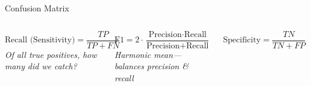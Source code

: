 \documentclass[aspectratio=169,11pt]{beamer}
\begin{document}
\begin{frame}{Confusion Matrix}
\begin{columns}[T]
\vspace{0.4em}
$\text{Recall (Sensitivity)} = \dfrac{TP}{TP+FN}$\\[0.2em]
{\scriptsize\textit{Of all true positives, how many did we catch?}}

\vspace{0.4em}
$\text{F1} = 2\cdot\dfrac{\text{Precision}\cdot\text{Recall}}{\text{Precision}+\text{Recall}}$\\[0.2em]
{\scriptsize\textit{Harmonic mean---balances precision \& recall}}

\vspace{0.4em}
$\text{Specificity} = \dfrac{TN}{TN+FP}$
\end{columns}
\end{frame}

\end{document}
